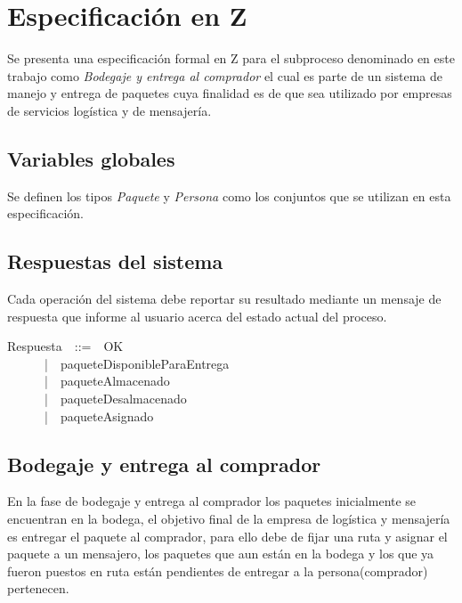 \documentclass[12pt,a4paper]{article}
\begin{document}
\newpage
\section{Especificación en Z}

Se presenta una especificación formal en Z para el subproceso denominado en este trabajo como \textit{Bodegaje y entrega al comprador} el cual es parte de un sistema de manejo y entrega de paquetes cuya finalidad es de que sea utilizado por empresas de servicios logística y de mensajería.  

\subsection{Variables globales}
Se definen los tipos \textit{Paquete} y \textit{Persona} como los conjuntos que se utilizan en esta especificación. 

\begin{zed}
\end{zed}

\subsection{Respuestas del sistema}

Cada operación del sistema debe reportar su resultado mediante un mensaje de respuesta que informe al usuario acerca del estado actual del proceso.

\begin{zed}
Respuesta~~::=~~OK\\
~~~~~~|~~paqueteDisponibleParaEntrega\\
~~~~~~|~~paqueteAlmacenado\\
~~~~~~|~~paqueteDesalmacenado\\
~~~~~~|~~paqueteAsignado\\
\end{zed}

\newpage
\subsection{Bodegaje y entrega al comprador}

En la fase de bodegaje y entrega al comprador los paquetes inicialmente se encuentran en la bodega, el objetivo final de la empresa de logística y mensajería es entregar el paquete al comprador, para ello debe de fijar una ruta y asignar el paquete a un mensajero, los paquetes que aun están en la bodega y los que ya fueron puestos en ruta están pendientes de entregar a la persona(comprador) pertenecen.
\end{document}
